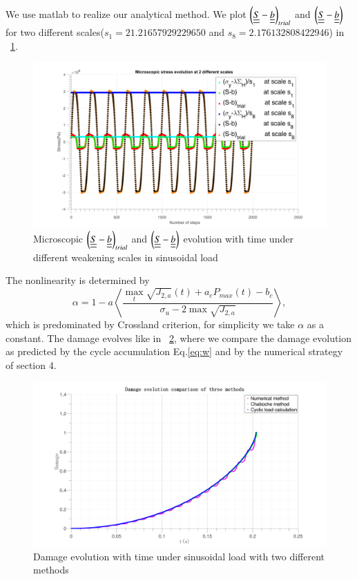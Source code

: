\documentclass[3p,times,procedia,number]{elsarticle}
\newcommand{\figref}[1]{\figurename~\ref{#1}}
\begin{document}
We use matlab to realize our analytical method. We plot $\left( \uline{\uline{S}}-\uline{\uline{b}}\right)_{trial}$ and $\left( \uline{\uline{S}}-\uline{\uline{b}}\right)$ for two different scales($s_1=21.21657929229650$ and $s_8=2.176132808422946$) in \figref{trialsin}.
\begin{figure}[!h]
	\centering
	\includegraphics[width=\textwidth]{figures//trialsin.png} 
	\caption{Microscopic $\left( \uline{\uline{S}}-\uline{\uline{b}}\right)_{trial}$ and $\left( \uline{\uline{S}}-\uline{\uline{b}}\right)$ evolution with time under different weakening scales in sinusoidal load}
	\label{trialsin}
\end{figure}

The nonlinearity is determined by 
$$\alpha=1 - a\left\langle \dfrac{\max\limits_{t}\sqrt{J_{2,a}}(t)+a_c{P_{max}(t)}-b_c}{ \sigma_{u} - 2\max\sqrt{J_{2,a}}}\right\rangle,$$ 
which is predominated by Crossland criterion, for simplicity we take $\alpha$ as a constant. The damage evolves like in \figref{damsin}, where we compare the damage evolution as predicted by the cycle accumulation Eq.\eqref{eq:w} and by the numerical strategy of section 4.

\begin{figure}[!h]
	\centering
	\includegraphics[width=\textwidth]{figures//damagesin.png} 
	\caption{Damage evolution with time under sinusoidal load with two different methods}
	\label{damsin}
\end{figure}
\end{document}
